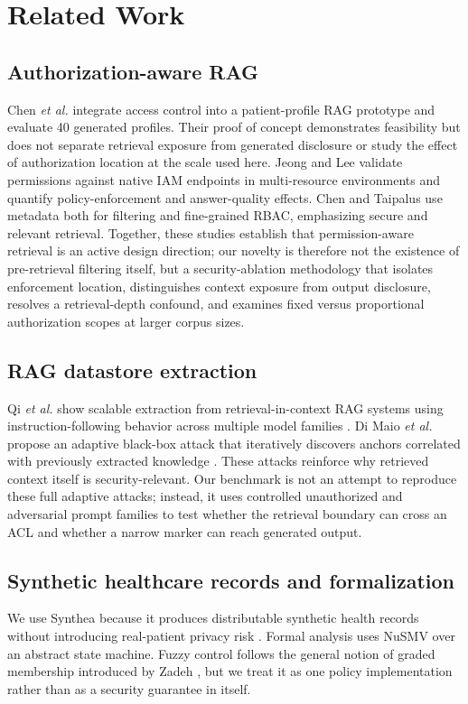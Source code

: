 \section{Related Work}
\subsection{Authorization-aware RAG}
Chen \emph{et al.} \cite{chen2025sac} integrate access control into a patient-profile RAG prototype and evaluate 40 generated profiles. Their proof of concept demonstrates feasibility but does not separate retrieval exposure from generated disclosure or study the effect of authorization location at the scale used here. Jeong and Lee \cite{jeong2025permission} validate permissions against native IAM endpoints in multi-resource environments and quantify policy-enforcement and answer-quality effects. Chen and Taipalus \cite{chen2026metadata} use metadata both for filtering and fine-grained RBAC, emphasizing secure and relevant retrieval. Together, these studies establish that permission-aware retrieval is an active design direction; our novelty is therefore not the existence of pre-retrieval filtering itself, but a security-ablation methodology that isolates enforcement location, distinguishes context exposure from output disclosure, resolves a retrieval-depth confound, and examines fixed versus proportional authorization scopes at larger corpus sizes.

\subsection{RAG datastore extraction}
Qi \emph{et al.} show scalable extraction from retrieval-in-context RAG systems using instruction-following behavior across multiple model families \cite{qi2025spill}. Di Maio \emph{et al.} propose an adaptive black-box attack that iteratively discovers anchors correlated with previously extracted knowledge \cite{dimaio2025pirates}. These attacks reinforce why retrieved context itself is security-relevant. Our benchmark is not an attempt to reproduce these full adaptive attacks; instead, it uses controlled unauthorized and adversarial prompt families to test whether the retrieval boundary can cross an ACL and whether a narrow marker can reach generated output.

\subsection{Synthetic healthcare records and formalization}
We use Synthea because it produces distributable synthetic health records without introducing real-patient privacy risk \cite{walonoski2018synthea}. Formal analysis uses NuSMV \cite{cimatti2002nusmv} over an abstract state machine. Fuzzy control follows the general notion of graded membership introduced by Zadeh \cite{zadeh1965fuzzy}, but we treat it as one policy implementation rather than as a security guarantee in itself.
